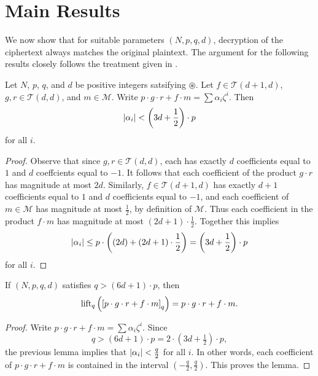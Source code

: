 \documentclass[10pt,reqno]{article}
\begin{document}
\section{Main Results}
We now show that for suitable parameters $(N,p,q,d)$, decryption of the ciphertext always matches the original plaintext. The argument for the following results closely follows the treatment given in \cite{Pipher_josephh.}.

\begin{lemma}\label{lemma:4.1}
    Let $N$, $p$, $q$, and $d$ be positive integers satsifying \hyperlink{star}{$\circledast$}. Let $f \in \mathcal{T}(d+1,d)$, $g,r \in \mathcal{T}(d,d)$, and $m \in \mathcal{M}$. Write $p\cdot g \cdot r + f \cdot m = \sum \alpha_i \zeta ^i$. Then 
    \[\abs{\alpha_i} < \left(3d+\frac{1}{2}\right)\cdot p\]
    for all $i$.
\end{lemma}
\begin{proof}
    Observe that since $g, r \in \mathcal{T}(d,d)$, each has exactly $d$ coefficients equal to $1$ and $d$ coeffcients equal to $-1$. It follows that each coefficient of the product $g\cdot r$ has magnitude at most $2d$. Similarly, $f \in \mathcal{T}(d+1,d)$ has exactly $d+1$ coefficients equal to $1$ and $d$ coefficients equal to $-1$, and each coefficient of $m \in \mathcal{M}$ has magnitude at most $\frac{1}{2}$, by definition of $\mathcal{M}$. Thus each coefficient in the product $f\cdot m$ has magnitude at most $(2d+1) \cdot \frac{1}{2}$. Together this implies 
    \begin{align*}
        \abs{\alpha_i} \leq  p \cdot \left( (2d) + \left(2d+1\right)\cdot \frac{1}{2} \right) = \left (3d+\frac{1}{2}\right) \cdot p  
    \end{align*}
    for all $i$.
    \end{proof}

\begin{lemma}\label{lemma:4.2}
If $(N, p, q, d)$ satisfies $q > (6d + 1) \cdot p$, then
    \[\lift{\eq{p \cdot g \cdot r + f \cdot m}{q}}{q}=p\cdot g \cdot r + f \cdot m.\]
\end{lemma}
\begin{proof}
Write $p\cdot g \cdot r + f \cdot m = \sum \alpha_i \zeta ^i$. Since 
    \[q >(6d+1) \cdot p = 2 \cdot (3d+\tfrac{1}{2}) \cdot p,\]
    the previous lemma implies that $\abs{\alpha_i}<\frac{q}{2}$ for all $i$. In other words,
    each coefficient of $p \cdot g \cdot r + f \cdot m$ is contained in the interval $(-\frac{q}{2},\frac{q}{2})$. This proves the lemma.
\end{proof}
\end{document}
